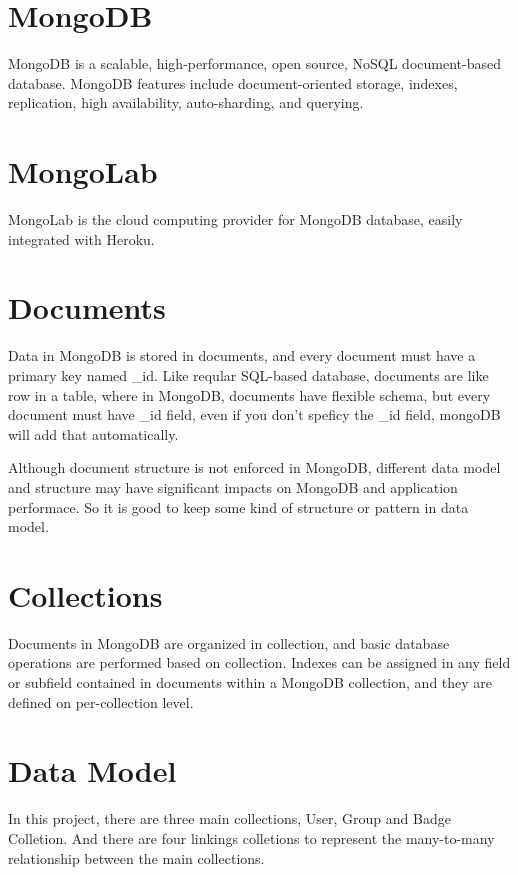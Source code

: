 
\section{MongoDB}
 MongoDB is a scalable, high-performance, open source, NoSQL document-based database. MongoDB features include document-oriented storage, indexes, replication, high availability, auto-sharding, and querying.  \cite{mongodb}

\section{MongoLab}
MongoLab is the cloud computing provider for MongoDB database, easily integrated with Heroku.  \cite{mongolab}

\section{Documents}
Data in MongoDB is stored in documents, and every document must have a primary key named {\_id}. Like reqular SQL-based database, documents are like row in a table, where in MongoDB, documents have flexible schema, but every document must have {\_id} field, even if you don't speficy the {\_id} field, mongoDB will add that automatically.  \cite{mongodb}

Although document structure is not enforced in MongoDB, different data model and structure may have significant impacts on MongoDB and application performace. So it is good to keep some kind of structure or pattern in data model.  

\section{Collections}
Documents in MongoDB are organized in collection, and basic database operations are performed based on collection. Indexes can be assigned in any field or subfield contained in documents within a MongoDB collection, and they are defined on per-collection level.  \cite{mongodb}   

\section{Data Model}
In this project, there are three main collections, User, Group and Badge Colletion. And there are four linkings colletions to represent the many-to-many relationship between the main collections.

